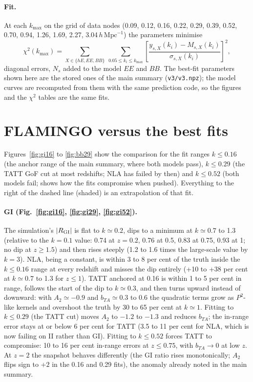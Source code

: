\documentclass[11pt]{article}
\newcommand{\hmpc}{\,h\,\mathrm{Mpc}^{-1}}
\newcommand{\kmax}{k_{\max}}
\begin{document}
\paragraph{Fit.} At each $\kmax$ on the grid of data nodes (0.09, 0.12, 0.16, 0.22, 0.29,
0.39, 0.52, 0.70, 0.94, 1.26, 1.69, 2.27, 3.04$\hmpc$) the parameters
minimise
\begin{equation}
  \chi^2(\kmax) = \sum_{X \in \{hE, EE, BB\}}\ \sum_{0.05 \le k_i \le \kmax}
  \left[\frac{y_{s,X}(k_i) - M_{s,X}(k_i)}{\sigma_{s,X}(k_i)}\right]^2 ,
\end{equation}
diagonal errors, $N_s$ added to the model $EE$ and $BB$. The best-fit
parameters shown here are the stored ones of the main summary
(\texttt{v3/v3.npz}); the model curves are recomputed from them with the same
prediction code, so the figures and the $\chi^2$ tables are the same fits.

\section{FLAMINGO versus the best fits}

Figures~\ref{fig:gi16} to \ref{fig:bb29} show the comparison for the fit
ranges $k \le 0.16$ (the anchor range of the main summary, where both models
pass), $k \le 0.29$ (the TATT GoF cut at most redshifts; NLA has failed by
then) and $k \le 0.52$ (both models fail; shows how the fits compromise when
pushed). Everything to the right of the dashed line (shaded) is an
extrapolation of that fit.

\paragraph{GI (Fig.~\ref{fig:gi16}, \ref{fig:gi29}, \ref{fig:gi52}).}
The simulation's $|R_{\rm GI}|$ is flat to $k \simeq 0.2$, dips to a minimum
at $k \simeq 0.7$ to 1.3 (relative to the $k = 0.1$ value: 0.74 at $z = 0.2$,
0.76 at 0.5, 0.83 at 0.75, 0.93 at 1; no dip at $z \ge 1.5$) and then rises
steeply (1.2 to 1.6 times the large-scale value by $k = 3$). NLA, being a
constant, is within 3 to 8 per cent of the truth inside the $k \le 0.16$
range at every redshift and misses the dip entirely (+10 to +38 per cent at
$k \simeq 0.7$ to 1.3 for $z \le 1$). TATT anchored at 0.16 is within 1 to 5
per cent in range, follows the start of the dip to $k \simeq 0.3$, and then
turns upward instead of downward: with $A_2 \simeq -0.9$ and $b_{TA} \simeq 0.3$
to 0.6 the quadratic terms grow as $P^2$-like kernels and overshoot the truth
by 30 to 65 per cent at $k \simeq 1$. Fitting to $k \le 0.29$ (the TATT cut)
moves $A_2$ to $-1.2$ to $-1.3$ and reduces $b_{TA}$; the in-range error stays
at or below 6 per cent for TATT (3.5 to 11 per cent for NLA, which is now failing on
II rather than GI). Fitting to $k \le 0.52$ forces TATT to compromise: 10 to
16 per cent in-range errors at $z \le 0.75$, with $b_{TA} \to 0$ at low $z$.
At $z = 2$ the snapshot behaves differently (the GI ratio rises
monotonically; $A_2$ flips sign to $+2$ in the 0.16 and 0.29 fits), the
anomaly already noted in the main summary.
\end{document}

